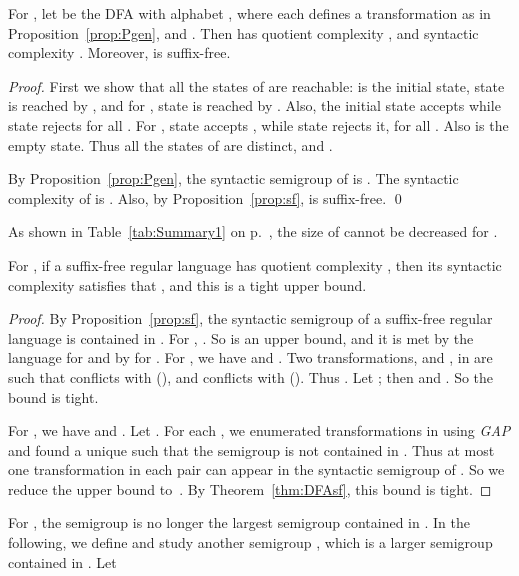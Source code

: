 \documentclass{llncs}
\begin{document}
\begin{theorem}
\label{thm:DFAsf}
For , let  be the DFA with alphabet , where each  defines a transformation as in Proposition~\ref{prop:Pgen}, and . 
Then  has quotient complexity , and syntactic complexity . Moreover,  is suffix-free.
\end{theorem}

\begin{proof}
First we show that all the states of  are reachable:  is the initial state,  state  is reached by , and for , state  is reached by . 
Also, the initial state  accepts  while state  rejects  for all . 
For ,  state  accepts , while state  rejects it, for all . Also  is the empty state. Thus all the states of  are distinct, and .


By Proposition~\ref{prop:Pgen}, the syntactic semigroup of  is . The syntactic complexity of  is . Also, by Proposition~\ref{prop:sf},  is suffix-free. \qed
\end{proof}

As shown in Table~\ref{tab:Summary1} on p.~\pageref{table1}, the size of  cannot be decreased for . 


\begin{theorem}\label{thm:sfsmall} 
For , if a suffix-free regular language  has quotient complexity , then its syntactic complexity satisfies that , and this is a tight upper bound. 
\end{theorem}

\begin{proof} 
By Proposition~\ref{prop:sf}, the syntactic semigroup of a suffix-free regular language  is contained in . 
For , . 
So  is an upper bound, and it is met by the language  for  and by  for . 
For , we have  and . 
Two transformations,  and , in  are such that  conflicts with  (), and  conflicts with  (). 
Thus . 
Let ; then  and . So the bound is tight.

For , we have  and . Let . For each , we enumerated transformations in  using \emph{GAP} and found a unique  such that the semigroup  is not contained in . Thus at most one transformation in each pair  can appear in the syntactic semigroup of . So we reduce the upper bound to~. By Theorem~\ref{thm:DFAsf}, this bound is tight. 
\end{proof}
\smallskip


For , the semigroup  is no longer the largest semigroup contained in . In the following, we define and study another semigroup , which is a larger semigroup contained in . Let 
 
\end{document}

